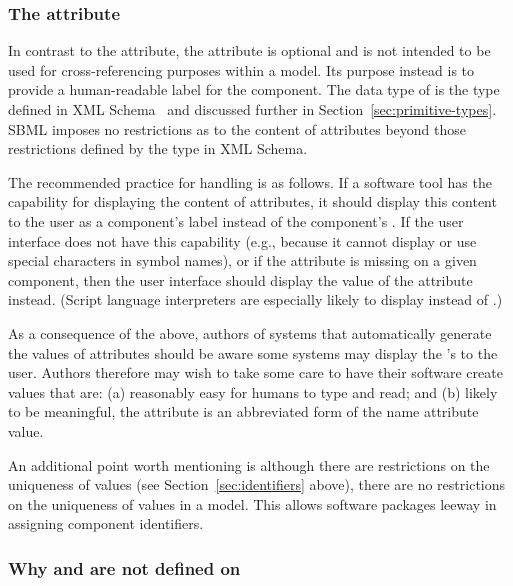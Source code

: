 \subsubsection{The  attribute}
\label{sec:name}

In contrast to the  attribute, the  attribute is
optional and is not intended to be used for cross-referencing
purposes within a model.  Its purpose instead is to provide a
human-readable label for the component.  The data type of 
 is the type  defined in XML
Schema~\citep{biron:2000,thompson:2000} and discussed further in
Section~\ref{sec:primitive-types}.  SBML imposes no restrictions
as to the content of  attributes beyond those restrictions
defined by the  type in XML Schema.

The recommended practice for handling  is as follows.
If a software tool has the capability for displaying the content
of  attributes, it should display this content to the user
as a component's label instead of the component's .
If the user interface does not have this capability (e.g.,
because it cannot display or use special characters in symbol
names), or if the  attribute is missing on a given
component, then the user interface should display the value of the
 attribute instead.  (Script language interpreters are
especially likely to display  instead of
.)

As a consequence of the above, authors of systems that
automatically generate the values of  attributes should be
aware some systems may display the 's to the user.
Authors therefore may wish to take some care to have their
software create  values that are: (a) reasonably easy
for humans to type and read; and (b) likely to be meaningful, \eg
the  attribute is an abbreviated form of the name attribute value.

An additional point worth mentioning is although there are
restrictions on the uniqueness of  values (see
Section~\ref{sec:identifiers} above), there are no restrictions on
the uniqueness of  values in a model.  This allows
software packages leeway in assigning component identifiers.


\subsubsection{Why  and  are not defined on }
\label{sec:why-not-on-sbase}

